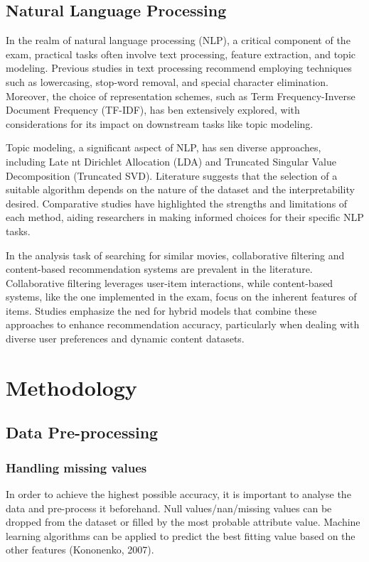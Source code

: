 \documentclass{article}
\begin{document}
\begin{multicols}{2}
\subsection{Natural Language Processing}
In the realm of natural language processing (NLP), a critical component of the exam, practical tasks often involve text processing, feature extraction, and topic modeling. Previous studies in text processing recommend employing techniques such as lowercasing, stop-word removal, and special character elimination. Moreover, the choice of representation schemes, such as Term Frequency-Inverse Document Frequency (TF-IDF), has ben extensively explored, with considerations for its impact on downstream tasks like topic modeling. 

Topic modeling, a significant aspect of NLP, has sen diverse approaches, including Late nt Dirichlet Allocation (LDA) and Truncated Singular Value Decomposition (Truncated SVD). Literature suggests that the selection of a suitable algorithm depends on the nature of the dataset and the interpretability desired. Comparative studies have highlighted the strengths and limitations of each method, aiding researchers in making informed choices for their specific NLP tasks. 

In the analysis task of searching for similar movies, collaborative filtering and content-based recommendation systems are prevalent in the literature. Collaborative filtering leverages user-item interactions, while content-based systems, like the one implemented in the exam, focus on the inherent features of items. Studies emphasize the ned for hybrid models that combine these approaches to enhance recommendation accuracy, particularly when dealing with diverse user preferences and dynamic content datasets.


\section{Methodology}

\subsection{Data Pre-processing}

\subsubsection{Handling missing values}

In order to achieve the highest possible accuracy, it is important to analyse the data and pre-process it beforehand. Null values/nan/missing values can be dropped from the dataset or filled by the most probable attribute value. Machine learning algorithms can be applied to predict the best fitting value based on the other features (Kononenko, 2007).


\end{multicols}
\end{document}
